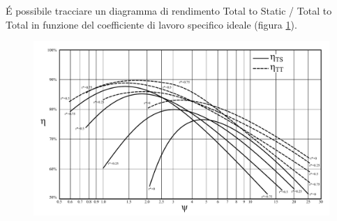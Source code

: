 \'E possibile tracciare un diagramma di rendimento Total to Static / Total to Total in funzione del coefficiente di lavoro specifico ideale (figura \ref{fig:Rendimenti_ts_tt}). 
\begin{figure}
\centering
  \includegraphics[width=.8\textwidth]{fig/Rendimenti_ts_tt.pdf}
\caption{}
\label{fig:Rendimenti_ts_tt}
\end{figure}
